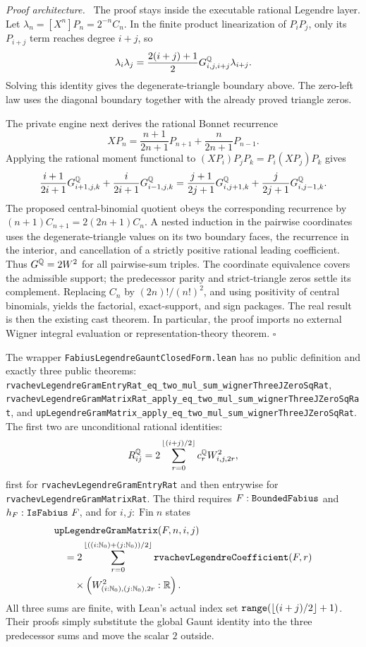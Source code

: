 \documentclass[11pt,oneside]{article}
\theoremstyle{definition}
\theoremstyle{remark}
\newenvironment{proofidea}{\par\smallskip\noindent\textit{Proof architecture.}\ }{\hfill$\square$\par\smallskip}
\begin{document}
\begin{proofidea}
The proof stays inside the executable rational Legendre layer.  Let
\(\lambda_n=[X^n]P_n=2^{-n}C_n\).  In the finite product linearization of \(P_iP_j\),
only its \(P_{i+j}\) term reaches degree \(i+j\), so
\[
 \lambda_i\lambda_j
 =\frac{2(i+j)+1}{2}G^{\mathbb{Q}}_{i,j,i+j}\lambda_{i+j}.
\]
Solving this identity gives the degenerate-triangle boundary above.  The zero-left law
uses the diagonal boundary together with the already proved triangle zeros.

The private engine next derives the rational Bonnet recurrence
\[
 XP_n=\frac{n+1}{2n+1}P_{n+1}+\frac n{2n+1}P_{n-1}.
\]
Applying the rational moment functional to
\((XP_i)P_jP_k=P_i(XP_j)P_k\) gives
\[
 \frac{i+1}{2i+1}G^{\mathbb{Q}}_{i+1,j,k}
 +\frac{i}{2i+1}G^{\mathbb{Q}}_{i-1,j,k}
 =\frac{j+1}{2j+1}G^{\mathbb{Q}}_{i,j+1,k}
 +\frac{j}{2j+1}G^{\mathbb{Q}}_{i,j-1,k}.
\]
The proposed central-binomial quotient obeys the corresponding recurrence by
\((n+1)C_{n+1}=2(2n+1)C_n\).  A nested induction in the pairwise coordinates uses the
degenerate-triangle values on its two boundary faces, the recurrence in the interior,
and cancellation of a strictly positive rational leading coefficient.  Thus
\(G^{\mathbb{Q}}=2W^2\) for all pairwise-sum triples.  The coordinate equivalence
covers the admissible support; the predecessor parity and strict-triangle zeros settle
its complement.  Replacing \(C_n\) by \((2n)!/(n!)^2\), and using positivity of central
binomials, yields the factorial, exact-support, and sign packages.  The real result is
then the existing cast theorem.  In particular, the proof imports no external Wigner
integral evaluation or representation-theory theorem.
\end{proofidea}

The wrapper \nolinkurl{FabiusLegendreGauntClosedForm.lean} has no public definition and
exactly three public theorems:
\nolinkurl{rvachevLegendreGramEntryRat_eq_two_mul_sum_wignerThreeJZeroSqRat},
\nolinkurl{rvachevLegendreGramMatrixRat_apply_eq_two_mul_sum_wignerThreeJZeroSqRat}, and
\nolinkurl{upLegendreGramMatrix_apply_eq_two_mul_sum_wignerThreeJZeroSqRat}.
The first two are unconditional rational identities:
\[
 R^{\mathbb{Q}}_{ij}
 =2\sum_{r=0}^{\left\lfloor (i+j)/2\right\rfloor}
 c_r^{\mathbb{Q}}W^2_{i,j,2r},
\]
first for \nolinkurl{rvachevLegendreGramEntryRat} and then entrywise for
\nolinkurl{rvachevLegendreGramMatrixRat}.  The third requires
\(F:\text{\ttfamily BoundedFabius}\) and \(h_F:\text{\ttfamily IsFabius}\ F\), and for
\(i,j:\operatorname{Fin}n\) states
\[
 \begin{aligned}
 &\text{\ttfamily upLegendreGramMatrix}(F,n,i,j)\\
 &\quad=2\sum_{r=0}^{\left\lfloor ((i:\mathbb{N}_{0})+(j:\mathbb{N}_{0}))/2\right\rfloor}
   \text{\ttfamily rvachevLegendreCoefficient}(F,r)\\
 &\qquad{}\times
   \left(W^2_{(i:\mathbb{N}_{0}),(j:\mathbb{N}_{0}),2r}:\mathbb{R}\right).
 \end{aligned}
\]
All three sums are finite, with Lean's actual index set
\(\text{\ttfamily range}(\left\lfloor (i+j)/2\right\rfloor+1)\).  Their proofs simply substitute the global
Gaunt identity into the three predecessor sums and move the scalar \(2\) outside.
\end{document}
